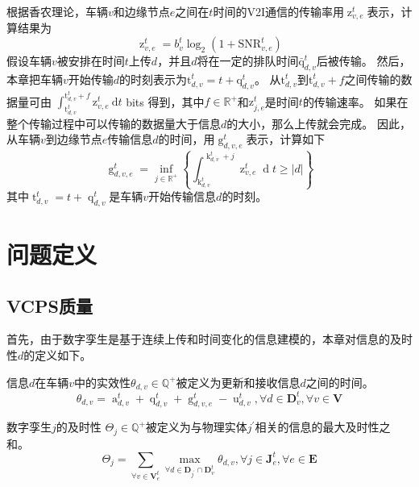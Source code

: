 根据香农理论，车辆$v$和边缘节点$e$之间在$t$时间的V2I通信的传输率用$\operatorname{z}_{v, e}^t$表示，计算结果为
\begin{equation}
    \operatorname{z}_{v, e}^t=b_{v}^{t} \log _{2}\left(1+\mathrm{SNR}_{v, e}^{t}\right)
\end{equation}
假设车辆$v$被安排在时间$t$上传$d$，并且$d$将在一定的排队时间$\mathrm{\bar{q}}_{d, v}^t$后被传输。
然后，本章把车辆$v$开始传输$d$的时刻表示为$\mathrm{t}_{d, v}^t=t+\mathrm{q}_{d, v}^t$。
从$\mathrm{t}_{d, v}^t$到$\mathrm{t}_{d, v}^t + f$之间传输的数据量可由 $\int_{\mathrm{t}_{d, v}^t}^{\mathrm{t}_{d, v}^t+f} \mathrm{z}_{v, e}^t \mathrm{~d} t$ bits 得到，其中$f \in \mathbb{R}^{+}$和$\mathrm{z}_{j, e}^t$是时间$t$的传输速率。
如果在整个传输过程中可以传输的数据量大于信息$d$的大小，那么上传就会完成。
因此，从车辆$v$到边缘节点$e$传输信息$d$的时间，用$\operatorname{g}_{d, v, e}^t$表示，计算如下 
\begin{equation}
    \operatorname{g}_{d, v, e}^t=\inf _{j \in \mathbb{R}^+} \left \{ \int_{\operatorname{k}_{d, v}^t}^{\operatorname{k}_{d, v}^t + j} {\operatorname{z}_{v, e}^t} \operatorname{d}t \geq \left|d\right| \right \} 
\end{equation}
\noindent 其中$\operatorname{t}_{d, v}^t = t +\operatorname{q}_{d, v}^t$是车辆$v$开始传输信息$d$的时刻。

\section{问题定义}\label{section 5-4}

\subsection{VCPS质量}
首先，由于数字孪生是基于连续上传和时间变化的信息建模的，本章对信息的及时性$d$的定义如下。
\begin{definition}
信息$d$在车辆$v$中的实效性$\theta_{d, v} \in \mathbb{Q}^{+}$被定义为更新和接收信息$d$之间的时间。
\begin{equation}
    \theta_{d, v} = \operatorname{a}_{d, v}^t + \operatorname{q}_{d, v}^t + \operatorname{g}_{d, v, e}^t-\operatorname{u}_{d, v}^{t}, \forall d \in \mathbf{D}_v^t,\forall v \in \mathbf{V}
\end{equation}
\end{definition}
\begin{definition}
数字孪生$j$的及时性 $\Theta_{j} \in \mathbb{Q}^{+}$被定义为与物理实体$j^{\prime}$相关的信息的最大及时性之和。
	\begin{equation}
    	\Theta_{j} = \sum_{\forall v\in \mathbf{V}_{e}^{t}} \max_{\forall d \in \mathbf{D}_{j^{\prime}} \cap \mathbf{D}_v^t}\theta_{d, v}, \forall j \in \mathbf{J}_{e}^{t}, \forall e \in \mathbf{E}
    	\label{equ 5-16}
	\end{equation}
\end{definition}

